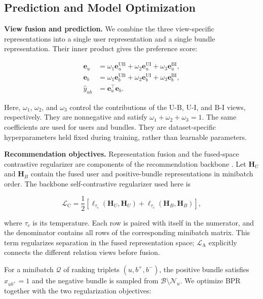 \documentclass[letterpaper]{article}
\begin{document}
\subsection{Prediction and Model Optimization}

\textbf{View fusion and prediction.} We combine the three view-specific representations into a single user representation and a single bundle representation. Their inner product gives the preference score:

\begin{equation}
\begin{aligned}
\mathbf e_u
&=\omega_1\mathbf e_u^{\mathrm{UB}}
+\omega_2\mathbf e_u^{\mathrm{UI}}
+\omega_3\mathbf e_u^{\mathrm{BI}},\\
\mathbf e_b
&=\omega_1\mathbf e_b^{\mathrm{UB}}
+\omega_2\mathbf e_b^{\mathrm{UI}}
+\omega_3\mathbf e_b^{\mathrm{BI}},\\
\hat y_{ub}&=\mathbf e_u^\top\mathbf e_b.
\end{aligned}
\tag{13}
\end{equation}

Here, $\omega_1$, $\omega_2$, and $\omega_3$ control the contributions of the U-B, U-I, and B-I views, respectively. They are nonnegative and satisfy $\omega_1+\omega_2+\omega_3=1$. The same coefficients are used for users and bundles. They are dataset-specific hyperparameters held fixed during training, rather than learnable parameters.

\textbf{Recommendation objectives.} Representation fusion and the fused-space contrastive regularizer are components of the recommendation backbone \cite{ma2024multicbr}. Let $\mathbf H_U$ and $\mathbf H_B$ contain the fused user and positive-bundle representations in minibatch order. The backbone self-contrastive regularizer used here is

\begin{equation}
\mathcal L_{\mathrm C}
=\frac{1}{2}
\left[
\ell_{\tau_c}(\mathbf H_U,\mathbf H_U)
+\ell_{\tau_c}(\mathbf H_B,\mathbf H_B)
\right],
\tag{14}
\end{equation}

where $\tau_c$ is its temperature. Each row is paired with itself in the numerator, and the denominator contains all rows of the corresponding minibatch matrix. This term regularizes separation in the fused representation space; $\mathcal L_{\mathrm A}$ explicitly connects the different relation views before fusion.

For a minibatch $\mathcal Q$ of ranking triplets $(u,b^+,b^-)$, the positive bundle satisfies $x_{ub^+}=1$ and the negative bundle is sampled from $\mathcal B\setminus\mathcal N_u$. We optimize BPR \cite{rendle2009bpr} together with the two regularization objectives:
\end{document}
